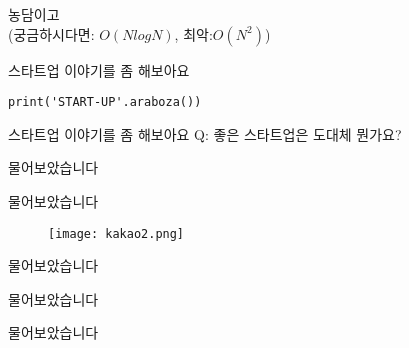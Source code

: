 \documentclass{beamer}
\begin{document}
\begin{frame}
농담이고\\
(궁금하시다면: $O(NlogN)$, 최악:$O(N^2)$)
\end{frame}

\begin{frame}[fragile]{스타트업 이야기를 좀 해보아요}
\begin{lstlisting}
print('START-UP'.araboza())
\end{lstlisting}
\end{frame}

\begin{frame}[fragile]{스타트업 이야기를 좀 해보아요}
Q: 좋은 스타트업은 도대체 뭔가요?
\end{frame}

\begin{frame}[fragile]{물어보았습니다}
\begin{figure}[H]
  \centering
\end{figure}
\end{frame}

\begin{frame}[fragile]{물어보았습니다}
\begin{figure}[H]
  \texttt{[image: kakao2.png]}
\end{figure}
\end{frame}

\begin{frame}[fragile]{물어보았습니다}
\begin{figure}[H]
  \centering
\end{figure}
\end{frame}

\begin{frame}[fragile]{물어보았습니다}
\begin{figure}[H]
  \centering
\end{figure}
\end{frame}

\begin{frame}[fragile]{물어보았습니다}
\begin{figure}[H]
  \centering
\end{figure}
\end{frame}
\end{document}
